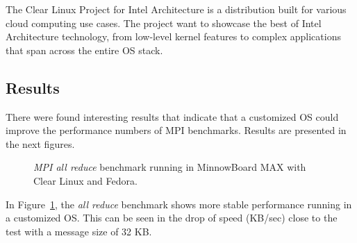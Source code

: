 The Clear Linux Project for Intel Architecture \cite{clear-linux} is a
distribution built for various cloud computing use cases. The project  want to showcase
the best of Intel Architecture technology, from low-level kernel features to
complex applications that span across the entire OS stack.

\subsection{Results}

There were found interesting results that indicate that a customized OS could 
improve the performance numbers of MPI benchmarks. Results are presented in the
next figures.


\begin{figure}[H]
\begin{center}
\end{center}
\caption{\textit{MPI all reduce} benchmark running in MinnowBoard MAX with Clear Linux and
Fedora.}
\label{mpi_allreduce_clr_fedora}
\end{figure}

In Figure~\ref{mpi_allreduce_clr_fedora}, the \textit{all reduce} benchmark
shows more stable performance running in a customized OS. This can be seen in
the drop of speed (KB/sec) close to the test with a message size of 32 KB. 

